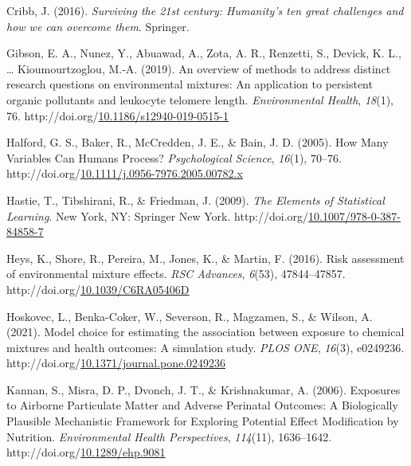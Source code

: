 \documentclass[12pt, twoside]{amherstthesis}
\newenvironment{CSLReferences}[2]%
  {}%
  {\par}
\begin{document}
\begin{CSLReferences}{1}{0}
\leavevmode{}%
Cribb, J. (2016). \emph{Surviving the 21st century: {Humanity}'s ten great challenges and how we can overcome them}. Springer.

\leavevmode{}%
Gibson, E. A., Nunez, Y., Abuawad, A., Zota, A. R., Renzetti, S., Devick, K. L., \ldots{} Kioumourtzoglou, M.-A. (2019). An overview of methods to address distinct research questions on environmental mixtures: An application to persistent organic pollutants and leukocyte telomere length. \emph{Environmental Health}, \emph{18}(1), 76. http://doi.org/\href{https://doi.org/10.1186/s12940-019-0515-1}{10.1186/s12940-019-0515-1}

\leavevmode{}%
Halford, G. S., Baker, R., McCredden, J. E., \& Bain, J. D. (2005). How {Many} {Variables} {Can} {Humans} {Process}? \emph{Psychological Science}, \emph{16}(1), 70--76. http://doi.org/\href{https://doi.org/10.1111/j.0956-7976.2005.00782.x}{10.1111/j.0956-7976.2005.00782.x}

\leavevmode{}%
Hastie, T., Tibshirani, R., \& Friedman, J. (2009). \emph{The {Elements} of {Statistical} {Learning}}. New York, NY: Springer New York. http://doi.org/\href{https://doi.org/10.1007/978-0-387-84858-7}{10.1007/978-0-387-84858-7}

\leavevmode{}%
Heys, K., Shore, R., Pereira, M., Jones, K., \& Martin, F. (2016). Risk assessment of environmental mixture effects. \emph{RSC Advances}, \emph{6}(53), 47844--47857. http://doi.org/\href{https://doi.org/10.1039/C6RA05406D}{10.1039/C6RA05406D}

\leavevmode{}%
Hoskovec, L., Benka-Coker, W., Severson, R., Magzamen, S., \& Wilson, A. (2021). Model choice for estimating the association between exposure to chemical mixtures and health outcomes: {A} simulation study. \emph{PLOS ONE}, \emph{16}(3), e0249236. http://doi.org/\href{https://doi.org/10.1371/journal.pone.0249236}{10.1371/journal.pone.0249236}

\leavevmode{}%
Kannan, S., Misra, D. P., Dvonch, J. T., \& Krishnakumar, A. (2006). Exposures to {Airborne} {Particulate} {Matter} and {Adverse} {Perinatal} {Outcomes}: {A} {Biologically} {Plausible} {Mechanistic} {Framework} for {Exploring} {Potential} {Effect} {Modification} by {Nutrition}. \emph{Environmental Health Perspectives}, \emph{114}(11), 1636--1642. http://doi.org/\href{https://doi.org/10.1289/ehp.9081}{10.1289/ehp.9081}


\end{CSLReferences}
\end{document}

